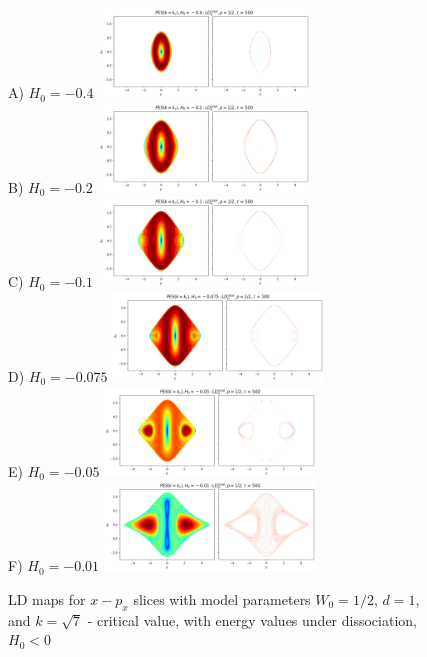 \documentclass[10pt,aps,onecolumn,superscriptaddress]{revtex4-2}
\begin{document}
\begin{figure}
    \centering
    A) $H_0 = -0.4$ \includegraphics[width=0.5\textwidth]{notebooks/bifurcation/k_critical/LD_total_y-py_tau_500_k_kc_E_-0.4.png}\\
    B) $H_0 = -0.2$ \includegraphics[width=0.5\textwidth]{notebooks/bifurcation/k_critical/LD_total_y-py_tau_500_k_kc_E_-0.2.png}\\
    C) $H_0 = -0.1$ \includegraphics[width=0.5\textwidth]{notebooks/bifurcation/k_critical/LD_total_y-py_tau_500_k_kc_E_-0.1.png}\\
    D) $H_0 = -0.075$ \includegraphics[width=0.5\textwidth]{notebooks/bifurcation/k_critical/LD_total_y-py_tau_500_k_kc_E_-0.075.png}\\
    E) $H_0 = -0.05$ \includegraphics[width=0.5\textwidth]{notebooks/bifurcation/k_critical/LD_total_y-py_tau_500_k_kc_E_-0.05.png}\\
    F) $H_0 = -0.01$ \includegraphics[width=0.5\textwidth]{notebooks/bifurcation/k_critical/LD_total_y-py_tau_500_k_kc_E_-0.01.png}
    \caption{LD maps for $x-p_x$ slices with model parameters $W_0 = 1/2$, $d = 1$, and $k = \sqrt{7}$ - critical value, with energy values under dissociation, $H_0 < 0$}
\end{figure}
\end{document}
